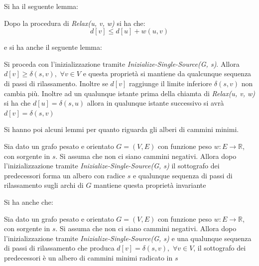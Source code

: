 \documentclass[a4paper,12pt, oneside]{book}
\begin{document}
Si ha il seguente lemma:
\begin{lemma}
  Dopo la procedura di \textit{Relax(u, v, w)} si ha che:
  \[d[v]\leq d[u]+w(u,v)\]
\end{lemma}
e si ha anche il seguente lemma:
\begin{lemma}
  Si proceda con l'inizializzazione tramite
  \textit{Inizialize-Single-Source(G, s)}. Allora $d[v]\geq
  \delta(s,v),\,\,\forall v\in V$ e questa proprietà si mantiene da
  qualcunque sequenza di passi di rilassamento. Inoltre se $d[v]$
  raggiunge il limite inferiore $\delta(s,v)$ non cambia più. Inoltre
  ad un qualunque istante prima della chiamta di \textit{Relax(u, v,
    w)} si ha che $d[u]=\delta(s, u)$ allora in qualunque istante
  successivo si avrà $d[v]=\delta(s,v)$
\end{lemma}
Si hanno poi alcuni lemmi per quanto riguarda gli alberi di cammini
minimi.
\begin{lemma}
  Sia dato un grafo pesato e orientato $G=(V,E)$ con funzione peso
  $w:E\to \mathbb{R}$, con sorgente in $s$. Si assuma che non ci siano
  cammini negativi. Allora dopo l'inizializzazione tramite
  \textit{Inizialize-Single-Source(G, s)} il sottografo dei
  predecessori forma un albero con radice $s$ e qualunque sequenza di
  passi di rilassamento sugli archi di $G$ mantiene questa proprietà
  invariante
\end{lemma}
Si ha anche che:
\begin{lemma}
  Sia dato un grafo pesato e orientato $G=(V,E)$ con funzione peso
  $w:E\to \mathbb{R}$, con sorgente in $s$. Si assuma che non ci siano
  cammini negativi. Allora dopo l'inizializzazione tramite
  \textit{Inizialize-Single-Source(G, s)} e una qualunque sequenza di
  passi di rilassamento che produca $d[v]=\delta(s,v),\,\,\forall v\in
  V$, il sottografo dei predecessori è un albero di cammini minimi
  radicato in $s$
\end{lemma}
\end{document}
